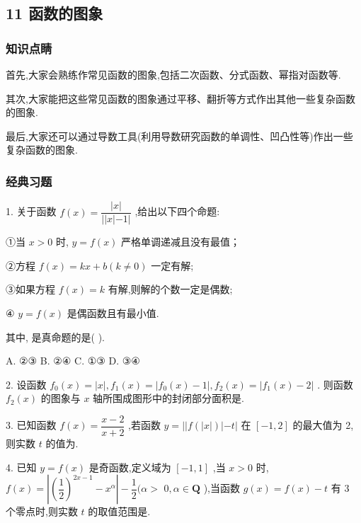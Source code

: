 \subsection*{11 函数的图象}

\subsubsection*{知识点睛}

首先,大家会熟练作常见函数的图象,包括二次函数、分式函数、幂指对函数等.

其次,大家能把这些常见函数的图象通过平移、翻折等方式作出其他一些复杂函数的图象.

最后,大家还可以通过导数工具(利用导数研究函数的单调性、凹凸性等)作出一些复杂函数的图象.

\subsubsection*{经典习题}

1. 关于函数 $f\left( x\right)  = \dfrac{\left| x\right| }{\left| \right| x\left| {-1}\right| }$ ,给出以下四个命题:

①当 $x > 0$ 时, $y = f\left( x\right)$ 严格单调递减且没有最值；

②方程 $f\left( x\right)  = {kx} + b\left( {k \neq  0}\right)$ 一定有解;

③如果方程 $f\left( x\right)  = k$ 有解,则解的个数一定是偶数;

④ $y = f\left( x\right)$ 是偶函数且有最小值.

其中, 是真命题的是(   ).

A. ②③ B. ②④ C. ①③ D. ③④

2. 设函数 ${f}_{0}\left( x\right)  = \left| x\right| ,{f}_{1}\left( x\right)  = \left| {{f}_{0}\left( x\right)  - 1}\right| ,{f}_{2}\left( x\right)  = \left| {{f}_{1}\left( x\right)  - 2}\right|$ . 则函数 ${f}_{2}\left( x\right)$ 的图象与 $x$ 轴所围成图形中的封闭部分面积是\blkda{}.

3. 已知函数 $f\left( x\right)  = \dfrac{x - 2}{x + 2}$ ,若函数 $y = \left| \right| f\left( \left| x\right| \right) \left| {-t}\right|$ 在 $\left\lbrack  {-1,2}\right\rbrack$ 的最大值为 2,则实数 $t$ 的值为\blkda{}.

4. 已知 $y = f\left( x\right)$ 是奇函数,定义域为 $\left\lbrack  {-1,1}\right\rbrack$ ,当 $x > 0$ 时, $f\left( x\right)  = \left| {{\left( \dfrac{1}{2}\right) }^{{2x} - 1} - {x}^{\alpha }}\right|  - \dfrac{1}{2}(\alpha  >$  $0,\alpha  \in  \mathbf{Q}$ ),当函数 $g\left( x\right)  = f\left( x\right)  - t$ 有 3 个零点时,则实数 $t$ 的取值范围是\blkda{}.

